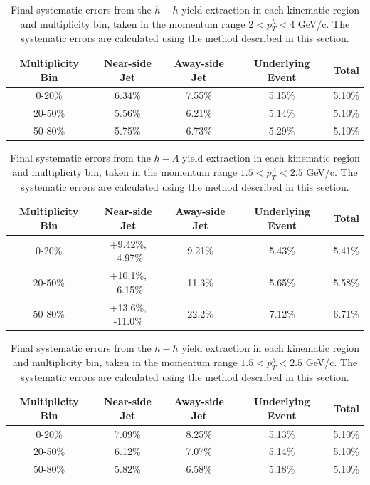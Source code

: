 \documentclass[ALICE,manyauthors]{ALICE_analysis_notes}
\begin{document}
\begin{table}[h!]
\centering
\begin{tabular}{| c | c | c | c | c | }
\hline
Multiplicity Bin & Near-side Jet & Away-side Jet & Underlying Event & Total  \\
\hline
0-20\% & 6.34\%   & 7.55\%  & 5.15\% & 5.10\% \\
20-50\% & 5.56\% & 6.21\%  & 5.14\% & 5.10\% \\
50-80\% & 5.75\% & 6.73\%  & 5.29\% & 5.10\% \\
\hline
\end{tabular}
\caption{Final systematic errors from the $h-h$ yield extraction in each kinematic region and multiplicity bin, taken in the momentum range $2 < p_{T}^{h} < 4$ GeV/c. The systematic errors are calculated using the method described in this section.}
\label{h_h_yield_extraction_systematics}
\end{table}

\begin{table}[h!]
\centering
\begin{tabular}{| c | c | c | c | c | }
\hline
Multiplicity Bin & Near-side Jet & Away-side Jet & Underlying Event & Total  \\
\hline
0-20\% & +9.42\%, -4.97\% & 9.21\%  & 5.43\% & 5.41\% \\
20-50\% & +10.1\%, -6.15\%  & 11.3\%  & 5.65\% & 5.58\% \\
50-80\% & +13.6\%, -11.0\%  & 22.2\%  & 7.12\% & 6.71\% \\
\hline
\end{tabular}
\caption{Final systematic errors from the $h-\Lambda$ yield extraction in each kinematic region and multiplicity bin, taken in the momentum range $1.5 < p_{T}^{\Lambda} < 2.5$ GeV/c. The systematic errors are calculated using the method described in this section.}
\label{h_lambda_yield_extraction_systematics_lowpt}
\end{table}
\begin{table}[h!]
\centering
\begin{tabular}{| c | c | c | c | c | }
\hline
Multiplicity Bin & Near-side Jet & Away-side Jet & Underlying Event & Total  \\
\hline
0-20\% & 7.09\%   & 8.25\%  & 5.13\% & 5.10\% \\
20-50\% & 6.12\% & 7.07\%  & 5.14\% & 5.10\% \\
50-80\% & 5.82\% & 6.58\%  & 5.18\% & 5.10\% \\
\hline
\end{tabular}
\caption{Final systematic errors from the $h-h$ yield extraction in each kinematic region and multiplicity bin, taken in the momentum range $1.5 < p_{T}^{h} < 2.5$ GeV/c. The systematic errors are calculated using the method described in this section.}
\label{h_h_yield_extraction_systematics_lowpt}
\end{table}
\end{document}
